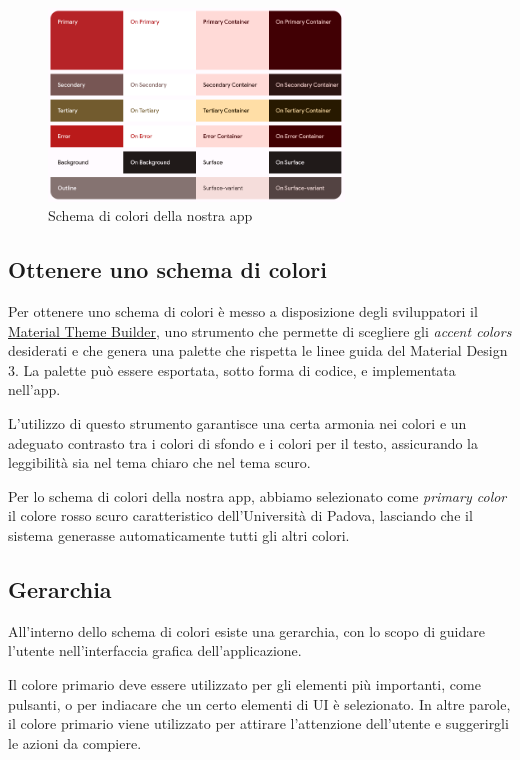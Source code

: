 \documentclass[12pt, a4paper]{report}
\begin{document}
		\begin{figure}[h]
   			\centering
   			\includegraphics[width=0.7\textwidth]{MD3colorscheme} %
 			\caption{Schema di colori della nostra app}
		\end{figure}
		
		\subsection{Ottenere uno schema di colori}
		Per ottenere uno schema di colori è messo a disposizione degli sviluppatori il \href{https://material-foundation.github.io/material-theme-builder/#/custom}{Material Theme Builder}, uno strumento che permette di scegliere gli \textit{accent colors} desiderati e che genera una palette che rispetta le linee guida del Material Design 3. La palette può essere esportata, sotto forma di codice, e implementata nell'app.
		
		L'utilizzo di questo strumento garantisce una certa armonia nei colori e un adeguato contrasto tra i colori di sfondo e i colori per il testo, assicurando la leggibilità sia nel tema chiaro che nel tema scuro.
		
		Per lo schema di colori della nostra app, abbiamo selezionato come \textit{primary color} il colore rosso scuro caratteristico dell'Università di Padova, lasciando che il sistema generasse automaticamente tutti gli altri colori.
		
		\subsection{Gerarchia}
		All'interno dello schema di colori esiste una gerarchia, con lo scopo di guidare l'utente nell'interfaccia grafica dell'applicazione. 
		
		Il colore primario deve essere utilizzato per gli elementi più importanti, come pulsanti, o per indiacare che un certo elementi di UI è selezionato. In altre parole, il colore primario viene utilizzato per attirare l'attenzione dell'utente e suggerirgli le azioni da compiere.
		
\end{document}
